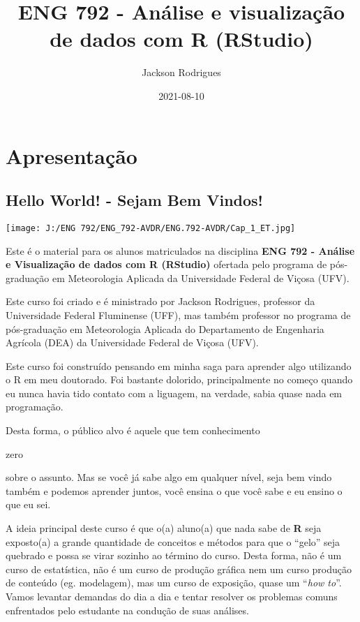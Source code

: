 \documentclass[
]{book}
\title{ENG 792 - Análise e visualização de dados com R (RStudio)}
\author{Jackson Rodrigues}
\date{2021-08-10}
\begin{document}
\maketitle

{
\setcounter{tocdepth}{1}
\tableofcontents
}
\hypertarget{apresentauxe7uxe3o}{%
\chapter{Apresentação}\label{apresentauxe7uxe3o}}

\hypertarget{hello-world---sejam-bem-vindos}{%
\section{Hello World! - Sejam Bem Vindos!}\label{hello-world---sejam-bem-vindos}}

\texttt{[image: J:/ENG 792/ENG\_792-AVDR/ENG.792-AVDR/Cap\_1\_ET.jpg]}

Este é o material para os alunos matriculados na disciplina \textbf{ENG 792 - Análise e Visualização de dados com R (RStudio)} ofertada pelo programa de pós-graduação em Meteorologia Aplicada da Universidade Federal de Viçosa (UFV).

Este curso foi criado e é ministrado por Jackson Rodrigues, professor da Universidade Federal Fluminense (UFF), mas também professor no programa de pós-graduação em Meteorologia Aplicada do Departamento de Engenharia Agrícola (DEA) da Universidade Federal de Viçosa (UFV).

Este curso foi construído pensando em minha saga para aprender algo utilizando o R em meu doutorado. Foi bastante dolorido, principalmente no começo quando eu nunca havia tido contato com a liguagem, na verdade, sabia quase nada em programação.

Desta forma, o público alvo é aquele que tem conhecimento

zero

sobre o assunto. Mas se você já sabe algo em qualquer nível, seja bem vindo também e podemos aprender juntos, você ensina o que você sabe e eu ensino o que eu sei.

A ideia principal deste curso é que o(a) aluno(a) que nada sabe de \textbf{R} seja exposto(a) a grande quantidade de conceitos e métodos para que o ``gelo'' seja quebrado e possa se virar sozinho ao término do curso. Desta forma, não é um curso de estatística, não é um curso de produção gráfica nem um curso produção de conteúdo (eg. modelagem), mas um curso de exposição, quase um ``\emph{how to}''. Vamos levantar demandas do dia a dia e tentar resolver os problemas comuns enfrentados pelo estudante na condução de suas análises.
\end{document}

